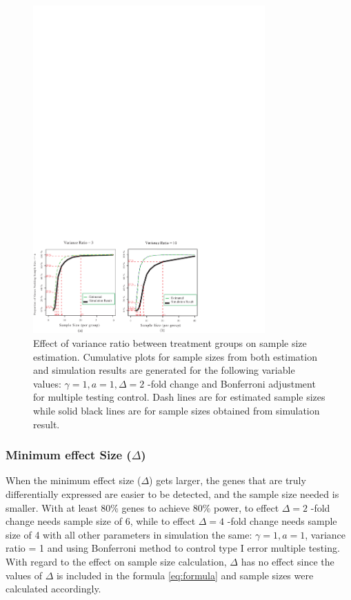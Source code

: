 \documentclass{bioinfo}
\begin{document}
\begin{figure}[h]
  \centerline{\includegraphics*[width=3.5in]{ResVarF.pdf}}
  \caption[Effect of variance ratio between treatment groups on sample size estimation]
  {Effect of variance ratio between treatment groups on sample size estimation.
    Cumulative plots for sample sizes from both estimation and simulation
    results are generated for the following variable values: $\gamma = 1, a = 1, \Delta = 2$ -fold change
    and Bonferroni adjustment for multiple testing control. Dash lines are for estimated sample sizes
    while solid black lines are for sample sizes obtained from simulation result.}
  \label{fig:ResVar}
\end{figure}

\subsubsection{Minimum effect Size ($\Delta$)}

When the minimum effect size ($\Delta$) gets larger, the genes that are truly differentially expressed are easier to be
detected, and the sample size needed is smaller.  With at least 80\% genes to achieve 80\% power, to effect $\Delta = 2$ -fold
change needs sample size of 6, while to effect $\Delta = 4$ -fold change needs sample size of 4 with all other parameters in
simulation the same: $\gamma = 1, a = 1$, variance ratio = 1 and using Bonferroni method to control type I error multiple
testing. With regard to the effect on sample size calculation, $\Delta$ has no effect since the values of $\Delta$ is included
in the formula \ref{eq:formula} and sample sizes were calculated accordingly.
\end{document}
